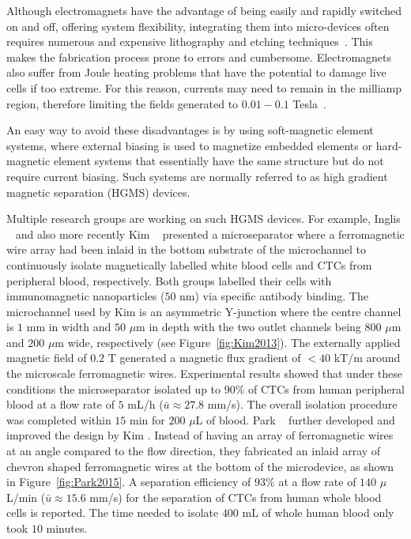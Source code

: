 Although electromagnets have the advantage of being easily and rapidly switched on and off, offering system flexibility, integrating them into micro-devices often requires numerous and expensive lithography and etching techniques~\cite{Pamme2006,Ganguly2010}. This makes the fabrication process prone to errors and cumbersome. Electromagnets also suffer from Joule heating problems that have the potential to damage live cells if too extreme. For this reason, currents may need to remain in the milliamp region, therefore limiting the fields generated to $0.01-0.1$ Tesla~\cite{Kong2011}.

An easy way to avoid these disadvantages is by using soft-magnetic element systems, where external biasing is used to magnetize embedded elements or hard-magnetic element systems that essentially have the same structure but do not require current biasing. Such systems are normally referred to as high gradient magnetic separation (HGMS) devices. 

Multiple research groups are working on such HGMS devices. For example, Inglis \etal{}~\cite{Inglis2004,Inglis2006a} and also more recently Kim \etal{}~\cite{Kim2013} presented a microseparator where a ferromagnetic wire array had been inlaid in the bottom substrate of the microchannel to continuously isolate magnetically labelled white blood cells and CTCs from peripheral blood, respectively. Both groups labelled their cells with immunomagnetic nanoparticles ($50$ nm) via specific antibody binding. The microchannel used by Kim \etal{} is an asymmetric Y-junction where the centre channel is $1$ mm in width and $50$ $\mu$m in depth with the two outlet channels being $800$ $\mu$m and $200$ $\mu$m wide, respectively (see Figure~\ref{fig:Kim2013}). The externally applied magnetic field of $0.2$ T generated a magnetic flux gradient of $<40$ kT/m around the microscale ferromagnetic wires. Experimental results showed that under these conditions the microseparator isolated up to $90\%$ of CTCs from human peripheral blood at a flow rate of $5$ mL/h ($\bar{u}\approx 27.8$ mm/s). The overall isolation procedure was completed within $15$ min for $200$ $\mu$L of blood. Park \etal{}~\cite{Park2015} further developed and improved the design by Kim \etal{}. Instead of having an array of ferromagnetic wires at an angle compared to the flow direction, they fabricated an inlaid array of chevron shaped ferromagnetic wires at the bottom of the microdevice, as shown in Figure~\ref{fig:Park2015}. A separation efficiency of $93\%$ at a flow rate of $140$ $\mu$L/min ($\bar{u}\approx 15.6$ mm/s) for the separation of CTCs from human whole blood cells is reported. The time needed to isolate $400$ mL of whole human blood only took $10$ minutes.

